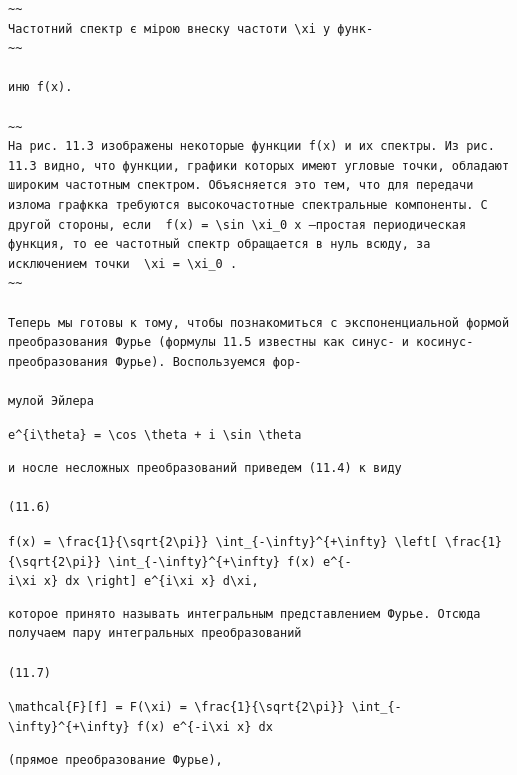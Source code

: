 \documentclass[
  ukrainian,
]{article}
\begin{document}
\begin{verbatim}
~~
Частотний спектр є мірою внеску частоти \xi у функ-
~~

иню f(x).

~~
На рис. 11.3 изображены некоторые функции f(x) и их спектры. Из рис. 11.3 видно, что функции, графики которых имеют угловые точки, обладают широким частотным спектром. Объясняется это тем, что для передачи излома графкка требуются высокочастотные спектральные компоненты. С другой стороны, если  f(x) = \sin \xi_0 x —простая периодическая функция, то ее частотный спектр обращается в нуль всюду, за исключением точки  \xi = \xi_0 .
~~

Теперь мы готовы к тому, чтобы познакомиться с экспоненциальной формой преобразования Фурье (формулы 11.5 известны как синус- и косинус-преобразования Фурье). Воспользуемся фор-

мулой Эйлера
\end{verbatim}

\texttt{e\^{}\{i\textbackslash{}theta\}\ =\ \textbackslash{}cos\ \textbackslash{}theta\ +\ i\ \textbackslash{}sin\ \textbackslash{}theta}

\begin{verbatim}
и носле несложных преобразований приведем (11.4) к виду

(11.6)
\end{verbatim}

\texttt{f(x)\ =\ \textbackslash{}frac\{1\}\{\textbackslash{}sqrt\{2\textbackslash{}pi\}\}\ \textbackslash{}int\_\{-\textbackslash{}infty\}\^{}\{+\textbackslash{}infty\}\ \textbackslash{}left{[}\ \textbackslash{}frac\{1\}\{\textbackslash{}sqrt\{2\textbackslash{}pi\}\}\ \textbackslash{}int\_\{-\textbackslash{}infty\}\^{}\{+\textbackslash{}infty\}\ f(x)\ e\^{}\{-i\textbackslash{}xi\ x\}\ dx\ \textbackslash{}right{]}\ e\^{}\{i\textbackslash{}xi\ x\}\ d\textbackslash{}xi,}

\begin{verbatim}
которое принято называть интегральным представлением Фурье. Отсюда получаем пару интегральных преобразований

(11.7)
\end{verbatim}

\texttt{\textbackslash{}mathcal\{F\}{[}f{]}\ =\ F(\textbackslash{}xi)\ =\ \textbackslash{}frac\{1\}\{\textbackslash{}sqrt\{2\textbackslash{}pi\}\}\ \textbackslash{}int\_\{-\textbackslash{}infty\}\^{}\{+\textbackslash{}infty\}\ f(x)\ e\^{}\{-i\textbackslash{}xi\ x\}\ dx}

\begin{verbatim}
(прямое преобразование Фурье),
\end{verbatim}
\end{document}
